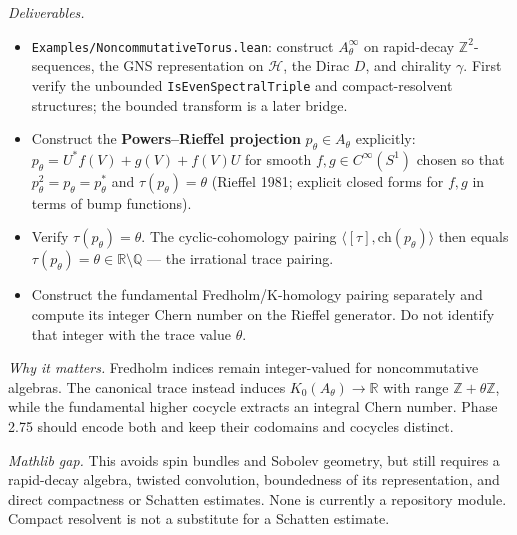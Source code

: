 \documentclass[
  11pt,
]{article}
\providecommand{\tightlist}{%
  \setlength{\itemsep}{0pt}\setlength{\parskip}{0pt}}
\begin{document}
\emph{Deliverables.}

\begin{itemize}
\tightlist
\item
  \texttt{Examples/NoncommutativeTorus.lean}: construct
  \(A_\theta^\infty\) on rapid-decay \(\mathbb{Z}^2\)-sequences, the GNS
  representation on \(\mathcal{H}\), the Dirac \(D\), and chirality
  \(\gamma\). First verify the unbounded
  \texttt{IsEvenSpectralTriple} and compact-resolvent structures; the
  bounded transform is a later bridge.
\item
  Construct the \textbf{Powers--Rieffel projection}
  \(p_\theta \in A_\theta\) explicitly:
  \(p_\theta = U^* f(V) + g(V) + f(V) U\) for smooth
  \(f, g \in C^\infty(S^1)\) chosen so that
  \(p_\theta^2 = p_\theta = p_\theta^*\) and \(\tau(p_\theta) = \theta\)
  (Rieffel 1981; explicit closed forms for \(f, g\) in terms of bump
  functions).
\item
  Verify \(\tau(p_\theta) = \theta\). The cyclic-cohomology pairing
  \(\langle [\tau], \mathrm{ch}(p_\theta) \rangle\) then equals
  \(\tau(p_\theta) = \theta \in \mathbb{R}\setminus \mathbb{Q}\) --- the
  irrational trace pairing.
\item
  Construct the fundamental Fredholm/K-homology pairing separately and
  compute its integer Chern number on the Rieffel generator. Do not
  identify that integer with the trace value \(\theta\).
\end{itemize}

\emph{Why it matters.} Fredholm indices remain integer-valued for
noncommutative algebras. The canonical trace instead induces
\(K_0(A_\theta)\to\mathbb{R}\) with range
\(\mathbb{Z}+\theta\mathbb{Z}\), while the fundamental higher cocycle
extracts an integral Chern number. Phase 2.75 should encode both and
keep their codomains and cocycles distinct.

\emph{Mathlib gap.} This avoids spin bundles and Sobolev geometry, but
still requires a rapid-decay algebra, twisted convolution, boundedness
of its representation, and direct compactness or Schatten estimates.
None is currently a repository module. Compact resolvent is not a
substitute for a Schatten estimate.
\end{document}
